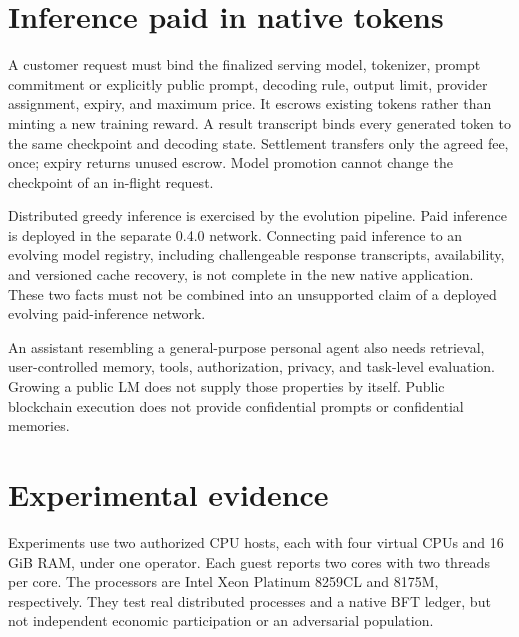 \documentclass[11pt]{article}
\begin{document}
\section{Inference paid in native tokens}
A customer request must bind the finalized serving model, tokenizer, prompt commitment or explicitly public prompt, decoding rule, output limit, provider assignment, expiry, and maximum price. It escrows existing tokens rather than minting a new training reward. A result transcript binds every generated token to the same checkpoint and decoding state. Settlement transfers only the agreed fee, once; expiry returns unused escrow. Model promotion cannot change the checkpoint of an in-flight request.

Distributed greedy inference is exercised by the evolution pipeline. Paid inference is deployed in the separate 0.4.0 network. Connecting paid inference to an evolving model registry, including challengeable response transcripts, availability, and versioned cache recovery, is not complete in the new native application. These two facts must not be combined into an unsupported claim of a deployed evolving paid-inference network.

An assistant resembling a general-purpose personal agent also needs retrieval, user-controlled memory, tools, authorization, privacy, and task-level evaluation. Growing a public LM does not supply those properties by itself. Public blockchain execution does not provide confidential prompts or confidential memories.

\section{Experimental evidence}
Experiments use two authorized CPU hosts, each with four virtual CPUs and 16 GiB RAM, under one operator. Each guest reports two cores with two threads per core. The processors are Intel Xeon Platinum 8259CL and 8175M, respectively. They test real distributed processes and a native BFT ledger, but not independent economic participation or an adversarial population.
\end{document}
